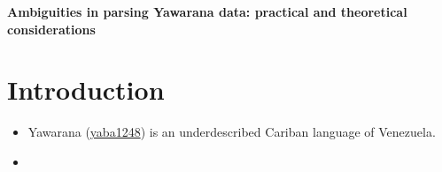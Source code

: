 \documentclass[10pt]{article}
\def\tightlist{\setlength\itemsep{0em}}
\begin{document}
\begin{center}
\Large \bfseries {Ambiguities in parsing Yawarana data: practical and theoretical considerations}
\end{center}

\section{Introduction \label{sec:intro}}

\begin{itemize}
\tightlist
\item
  Yawarana
  (\href{https://glottolog.org/resource/languoid/id/yaba1248}{yaba1248})
  is an underdescribed Cariban language of Venezuela.
\item
  \textcite{matter2022uniparser}
\end{itemize}

\printbibliography
\end{document}
